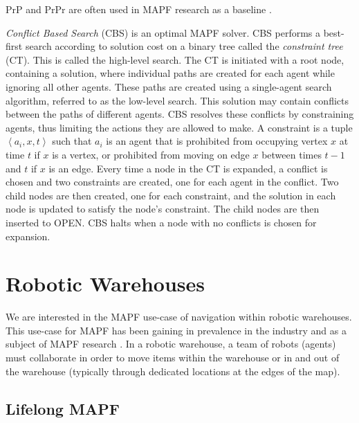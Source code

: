 \documentclass{article}
\newcommand{\lm}{Lifelong MAPF\xspace}
\newcommand{\tuple}[1]{\ensuremath{\left \langle #1 \right \rangle }}
\begin{document}
PrP and PrPr are often used in MAPF research as a baseline \cite{ma2019searching,andreychuk2018two}.

\emph{Conflict Based Search} (CBS) is an optimal MAPF solver. CBS performs a best-first search according to solution cost on a binary tree called the \emph{constraint tree} (CT). This is called the high-level search. The CT is initiated with a root node, containing a solution, where individual paths are created for each agent while ignoring all other agents. These paths are created using a single-agent search algorithm, referred to as the low-level search. This solution may contain conflicts between the paths of different agents. 
CBS resolves these conflicts by constraining agents, thus limiting the actions they are allowed to make. A constraint is a tuple $\tuple{a_i,x,t}$ such that $a_i$ is an agent that is prohibited from occupying vertex $x$ at time $t$ if $x$ is a vertex, or prohibited from moving on edge $x$ between times $t-1$ and $t$ if $x$ is an edge. Every time a node in the CT is expanded, a conflict is chosen and two constraints are created, one for each agent in the conflict. Two child nodes are then created, one for each constraint, and the solution in each node is updated to satisfy the node's constraint. The child nodes are then inserted to OPEN. CBS halts when a node with no conflicts is chosen for expansion.


\section{Robotic Warehouses}

We are interested in the MAPF use-case of navigation within robotic warehouses. This use-case for MAPF has been gaining in prevalence in the industry and as a subject of MAPF research \cite{ma2019lifelong}. In a robotic warehouse, a team of robots (agents) must collaborate in order to move items within the warehouse or in and out of the warehouse (typically through dedicated locations at the edges of the map). 

\subsection{\lm}
\end{document}
